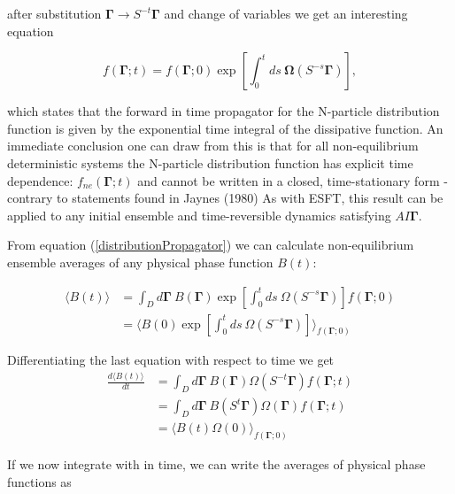 \documentclass[a4paper,12pt,nofootinbib]{article}
\begin{document}
after substitution $\bm{\Gamma} \to S^{-t}\bm{\Gamma}$ and change of variables we get an interesting equation

\begin{equation}
\label{distributionPropagator}
    f(\bm{\Gamma};t)=f(\bm{\Gamma};0)\exp[\int_0^t ds\ \bm{\Omega}(S^{-s} \bm{\Gamma})],
\end{equation}

which states that the forward in time propagator for the N-particle distribution function is given by the exponential time integral of the dissipative function. 
An immediate conclusion one can draw from this is that for all non-equilibrium deterministic systems the N-particle distribution function has explicit time dependence: $f_{ne}(\bm{\Gamma};t)$ and cannot be written in a closed, time-stationary form - contrary to statements found in Jaynes (1980)
As with ESFT, this result can be applied to any initial ensemble and time-reversible dynamics satisfying $AI\bm{\Gamma}$.

From equation (\ref{distributionPropagator}) we can calculate non-equilibrium ensemble averages of any physical phase function $B(t)$:

\begin{equation}
\begin{aligned}
	  \langle B(t) \rangle &= \int_D d\bm{\Gamma}\ B(\bm{\Gamma})\exp[\int_0^{t} ds\ \Omega(S^{-s}\bm{\Gamma})]f(\bm{\Gamma};0)\\
	  &= \langle B(0) \exp[\int_0^{t} ds\ \Omega(S^{-s}\bm{\Gamma})] \rangle_{f(\bm{\Gamma};0)}
\end{aligned}
\end{equation}

Differentiating the last equation with respect to time we get
\begin{equation}
\begin{aligned}
 \frac{d\langle B(t) \rangle}{dt}
 &= \int_D d\bm{\Gamma}\ B(\bm{\Gamma}) \Omega(S^{-t}\bm{\Gamma}) f(\bm{\Gamma};t)\\
&= \int_D d\bm{\Gamma}\ B(S^t \bm{\Gamma}) \Omega(\bm{\Gamma})f(\bm{\Gamma};t)\\
&= \langle B(t)\Omega(0) \rangle_{f(\bm{\Gamma};0)}
\end{aligned}
\end{equation}

If we now integrate with in time, we can write the averages of physical phase functions as
\end{document}
